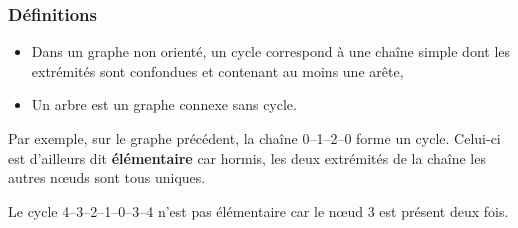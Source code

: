 \begin{frame}[fragile]
\frametitle{Définitions}

\begin{defi}
\begin{itemize}
\item Dans un graphe non orienté, un cycle correspond à une chaîne simple dont les extrémités sont confondues et contenant au moins une arête,
\item Un arbre est un graphe connexe sans cycle.
\end{itemize}
\end{defi}

\begin{minipage}{0.7\linewidth}
Par exemple, sur le graphe précédent, la chaîne 0--1--2--0 forme un cycle. Celui-ci est d'ailleurs dit \textbf{élémentaire} car hormis, les deux extrémités de la chaîne les autres n\oe{}uds sont tous uniques.

Le cycle 4--3--2--1--0--3--4 n'est pas élémentaire car le n\oe{}ud 3 est présent deux fois.
\end{minipage}\hfill
\begin{minipage}{0.25\linewidth}
\end{minipage}

\begin{center}
\end{center}

\end{frame}

